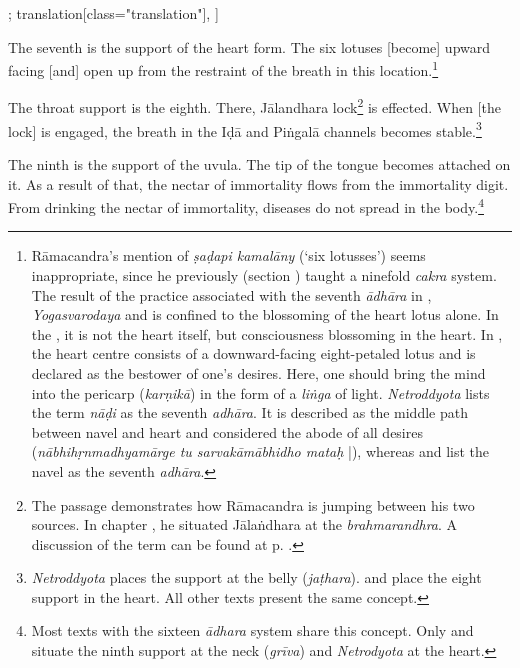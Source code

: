 \begin{alignment}[
  texts=edition[class="edition"];
  translation[class="translation"],
  ]
\begin{translation}
\begin{tlate}[p30_03]
     The seventh is the support of the heart form. The six lotuses [become] upward facing [and] open up from the restraint of the breath in this location.\footnote{Rāmacandra's mention of \textit{ṣaḍapi kamalāny} (`six lotusses') seems inappropriate, since he previously (section ) taught a ninefold \textit{cakra} system. The result of the practice associated with the seventh \textit{ādhāra} in , \textit{Yogasvarodaya} and  is confined to the blossoming of the heart lotus alone. In the , it is not the heart itself, but consciousness blossoming in the heart. In , the heart centre consists of a downward-facing eight-petaled lotus and is declared as the bestower of one's desires. Here, one should bring the mind into the pericarp (\textit{karṇikā}) in the form of a \textit{liṅga} of light. \textit{Netroddyota} lists the term \textit{nāḍi} as the seventh \textit{adhāra}. It is described as the middle path between navel and heart and considered the abode of all desires (\textit{nābhihṛnmadhyamārge tu sarvakāmābhidho mataḥ} |), whereas  and  list the navel as the seventh \textit{adhāra}.}

      The throat support is the eighth. There, Jālandhara lock\footnote{The passage demonstrates how Rāmacandra is jumping between his two sources. In chapter , he situated Jālaṅdhara at the \textit{brahmarandhra}. A discussion of the term can be found at p. \pageref{cakra8trans}.} is effected. When [the lock] is engaged, the breath in the Iḍā and Piṅgalā channels becomes stable.\footnote{\textit{Netroddyota} places the support at the belly (\textit{jaṭhara}).  and  place the eight support in the heart. All other texts present the same concept.}

      The ninth is the support of the uvula. The tip of the tongue becomes attached on it. As a result of that, the nectar of immortality flows from the immortality digit. From drinking the nectar of immortality, diseases do not spread in the body.\footnote{Most texts with the sixteen \textit{ādhara} system share this concept. Only  and  situate the ninth support at the neck (\textit{grīva}) and \textit{Netrodyota} at the heart.}      
     \flushpage
     \end{tlate}
  \end{translation}
\end{alignment}
